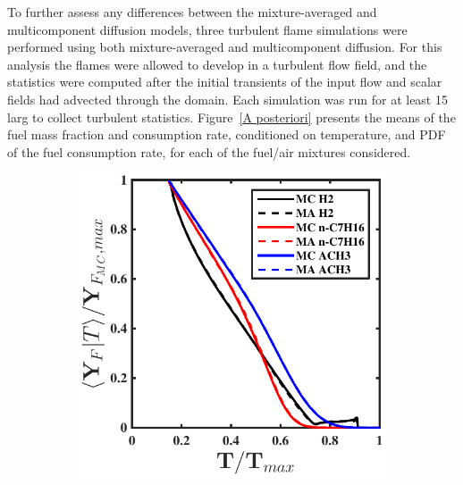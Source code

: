 \documentclass[preprint,review,12pt]{elsarticle}
\begin{document}
To further assess any differences between the mixture-averaged and multicomponent diffusion models, three turbulent flame simulations were performed using both mixture-averaged and multicomponent diffusion.
For this analysis the flames were allowed to develop in a turbulent flow field, and the statistics were computed after the initial transients of the input flow and scalar fields had advected through the domain.
Each simulation was run for at least 15 larg to collect turbulent statistics.
Figure~\ref{A posteriori} presents the means of the fuel mass fraction and consumption rate, conditioned on temperature, and PDF of the fuel consumption rate, for each of the fuel/air mixtures considered.
\begin{figure}[htb]
    \begin{subfigure}{0.33\textwidth}
        \centering
            \includegraphics[width=\textwidth]{condmean_massfrac.pdf}
        \caption{}\label{A posteriori  (a)}
    \end{subfigure}
    \begin{subfigure}{0.33\textwidth}
        \centering

\end{subfigure}
\end{figure}
\end{document}
